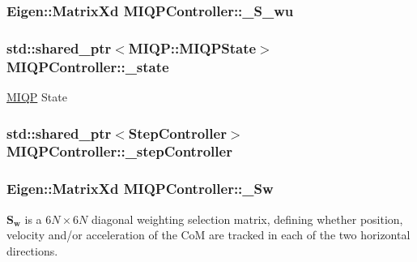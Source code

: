 \hypertarget{classMIQPController_a3af5e6941ac9d9896e3ad67830115108}{
\subsubsection[{\-\_\-\-S\-\_\-wu}]{\setlength{\rightskip}{0pt plus 5cm}\-Eigen\-::\-Matrix\-Xd {\bf \-M\-I\-Q\-P\-Controller\-::\-\_\-\-S\-\_\-wu}}}\label{classMIQPController_a3af5e6941ac9d9896e3ad67830115108}
\hypertarget{classMIQPController_aeaa4c96afe2d1d975667338e858f4a90}{
\subsubsection[{\-\_\-state}]{\setlength{\rightskip}{0pt plus 5cm}std\-::shared\-\_\-ptr$<${\bf \-M\-I\-Q\-P\-::\-M\-I\-Q\-P\-State}$>$ {\bf \-M\-I\-Q\-P\-Controller\-::\-\_\-state}}}\label{classMIQPController_aeaa4c96afe2d1d975667338e858f4a90}
\hyperlink{namespaceMIQP}{\-M\-I\-Q\-P} \-State \hypertarget{classMIQPController_a10018469a257136470ad9293fc3fe84a}{
\subsubsection[{\-\_\-step\-Controller}]{\setlength{\rightskip}{0pt plus 5cm}std\-::shared\-\_\-ptr$<${\bf \-Step\-Controller}$>$ {\bf \-M\-I\-Q\-P\-Controller\-::\-\_\-step\-Controller}}}\label{classMIQPController_a10018469a257136470ad9293fc3fe84a}
\hypertarget{classMIQPController_ada92fc35065a11b889019f2948c1888d}{
\subsubsection[{\-\_\-\-Sw}]{\setlength{\rightskip}{0pt plus 5cm}\-Eigen\-::\-Matrix\-Xd {\bf \-M\-I\-Q\-P\-Controller\-::\-\_\-\-Sw}}}\label{classMIQPController_ada92fc35065a11b889019f2948c1888d}
$\mathbf{S_w}$ is a $6N\times6N$ diagonal weighting selection matrix, defining whether position, velocity and/or acceleration of the \-Co\-M are tracked in each of the two horizontal directions.

